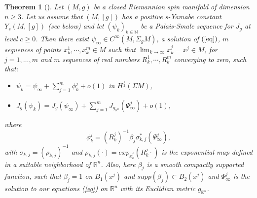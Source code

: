\documentclass[11pt]{article}
\newtheorem{theorem}{Theorem}[section]
\def \R {\mathbb{R}}
\def \N {\mathbb{N}}
\begin{document}
{\begin{theorem}[\cite{MMM}]\label{thm1}
Let $(M,g)$ be a closed Riemannian spin manifold of dimension $n \geq 3$. Let us assume that $(M,[g])$ has a positive s-Yamabe constant $Y_s(M,[g])$ (see below) and let $(\psi_{k})_{k\in \N}$ be a Palais-Smale sequence for $J_{g}$ at level $c\geq 0$. Then there exist $\psi_{\infty}\in C^{\infty}(M,\Sigma_{g} M)$, a solution of $(\ref{eq})$, $m$ sequences of points $x_{k}^{1},\cdots, x_{k}^{m} \in M$ such that $\lim_{k\to \infty}x_{k}^{j}= x^{j}\in M$, for $j=1,\dots,m$ and $m$ sequences of real numbers $R_{k}^{1},\cdots, R_{k}^{m}$ converging to zero, such that:
\begin{itemize}
\item[i)]  $\displaystyle \psi_{k}=\psi_{\infty}+\sum_{j=1}^{m}\phi_{k}^{j}+o(1)$ in $H^{\frac{1}{2}}(\Sigma M)$,
\item[ii)] $\displaystyle J_{g}(\psi_{k})=J_{g}(\psi_{\infty})+ 
    \sum_{j=1}^{m}J_{g_{\mathbb{R}^{n}}}(\Psi_\infty^{j})+o(1)$,
\end{itemize}
where
$$\phi_{k}^{j}=(R_{k}^{j})^{-1}\beta_{j}\sigma_{k,j}^{*}(\Psi_\infty^{j}) ,$$
with $\sigma_{k,j}=(\rho_{k,j})^{-1}$ and $\rho_{k,j}(\cdot)=exp_{x_{k}^j}(R_{k}^j \cdot)$ is the exponential map defined in a suitable neighborhood of $\R^{n}$.
Also, here $\beta_{j}$ is a smooth compactly supported function, such that $\beta_{j}=1$ on $B_{1}(x^{j})$ and $supp(\beta_{j})\subset B_{2}(x^{j})$ and $\Psi_\infty^{j}$ is the solution to our equations (\ref{eq}) on $\mathbb{R}^n$ with its Euclidian metric $g_{\R^n}$.
\end{theorem}

}
\end{document}
